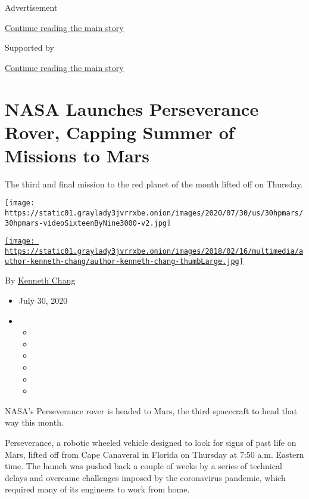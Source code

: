 Advertisement

\protect\hyperlink{after-top}{Continue reading the main story}

Supported by

\protect\hyperlink{after-sponsor}{Continue reading the main story}

\hypertarget{nasa-launches-perseverance-rover-capping-summer-of-missions-to-mars}{%
\section{NASA Launches Perseverance Rover, Capping Summer of Missions to
Mars}\label{nasa-launches-perseverance-rover-capping-summer-of-missions-to-mars}}

The third and final mission to the red planet of the month lifted off on
Thursday.

\texttt{[image: https://static01.graylady3jvrrxbe.onion/images/2020/07/30/us/30hpmars/30hpmars-videoSixteenByNine3000-v2.jpg]}

\href{https://www.nytimes3xbfgragh.onion/by/kenneth-chang}{\texttt{[image: https://static01.graylady3jvrrxbe.onion/images/2018/02/16/multimedia/author-kenneth-chang/author-kenneth-chang-thumbLarge.jpg]}}

By \href{https://www.nytimes3xbfgragh.onion/by/kenneth-chang}{Kenneth
Chang}

\begin{itemize}
\item
  July 30, 2020
\item
  \begin{itemize}
  \item
  \item
  \item
  \item
  \item
  \item
  \end{itemize}
\end{itemize}

NASA's Perseverance rover is headed to Mars, the third spacecraft to
head that way this month.

Perseverance, a robotic wheeled vehicle designed to look for signs of
past life on Mars, lifted off from Cape Canaveral in Florida on Thursday
at 7:50 a.m. Eastern time. The launch was pushed back a couple of weeks
by a series of technical delays and overcame challenges imposed by the
coronavirus pandemic, which required many of its engineers to work from
home.

